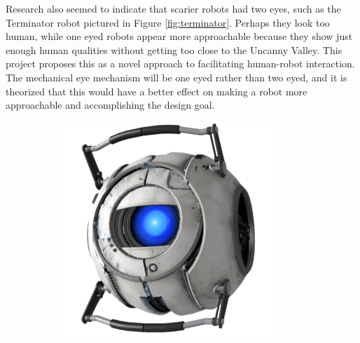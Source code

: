 Research also seemed to indicate that scarier robots had two eyes, such as the Terminator robot pictured in Figure \ref{fig:terminator}. Perhaps they look too human, while one eyed robots appear more approachable because they show just enough human qualities without getting too close to the Uncanny Valley. This project proposes this as a novel approach to facilitating human-robot interaction. The mechanical eye mechanism will be one eyed rather than two eyed, and it is theorized that this would have a better effect on making a robot more approachable and accomplishing the design goal.
\begin{figure}[h]
\centering
\begin{subfigure}{0.2\textwidth}
    \includegraphics[width=\textwidth]{Thesis/ch1/300px-Wheatley.png}
    \label{fig:first}
\end{subfigure}
\hfill
\begin{subfigure}{0.2\textwidth}

\end{subfigure}
\end{figure}
